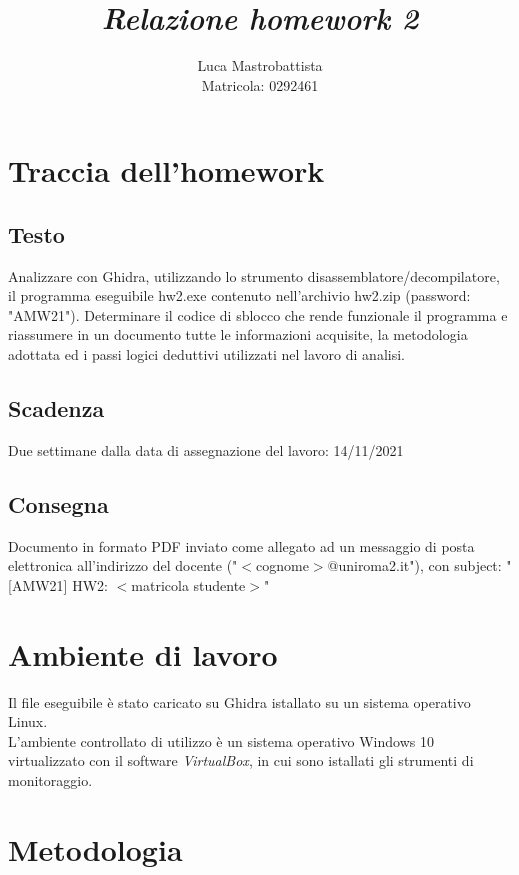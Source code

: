\documentclass[a4paper, 12pt]{article}
\begin{document}
\sloppy
  
\title{
  \textbf{
    \emph{Relazione homework 2}
  }
}  
\author{Luca Mastrobattista\\ Matricola: 0292461}
\date{}
\maketitle

\tableofcontents
\newpage
\section{Traccia dell'homework}
\subsection{Testo}
Analizzare con Ghidra, utilizzando lo strumento
disassemblatore/decompilatore, il programma eseguibile
hw2.exe contenuto nell'archivio hw2.zip (password: "AMW21").
Determinare il codice di sblocco che rende funzionale il
programma e riassumere in un documento tutte le informazioni
acquisite, la metodologia adottata ed i passi logici deduttivi
utilizzati nel lavoro di analisi.
\subsection{Scadenza}
Due settimane dalla data di assegnazione del lavoro: 14/11/2021
\subsection{Consegna}
Documento in formato PDF inviato come allegato ad
un messaggio di posta elettronica all'indirizzo del docente
("$<$cognome$>$@uniroma2.it"), con subject:
"[AMW21] HW2: $<$matricola studente$>$"

\newpage
\section{Ambiente di lavoro}
Il file eseguibile è stato caricato su Ghidra istallato su un sistema operativo Linux. \\
L'ambiente controllato di utilizzo è un sistema operativo Windows 10 virtualizzato con il software \emph{VirtualBox}, in cui sono istallati gli strumenti di monitoraggio.


\newpage
\section{Metodologia}
\end{document}
